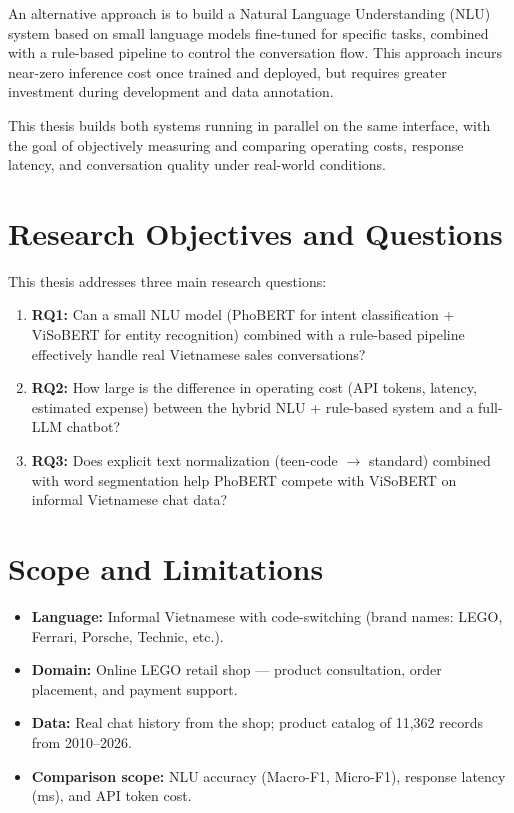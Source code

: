 \documentclass[12pt, a4paper]{report}
\begin{document}
An alternative approach is to build a Natural Language Understanding (NLU) system
based on small language models fine-tuned for specific tasks,
combined with a rule-based pipeline to control the conversation flow.
This approach incurs near-zero inference cost once trained and deployed,
but requires greater investment during development and data annotation.

This thesis builds both systems running in parallel on the same interface,
with the goal of objectively measuring and comparing operating costs,
response latency, and conversation quality under real-world conditions.

\section{Research Objectives and Questions}

This thesis addresses three main research questions:

\begin{enumerate}
  \item \textbf{RQ1:} Can a small NLU model (PhoBERT for intent classification +
        ViSoBERT for entity recognition) combined with a rule-based pipeline
        effectively handle real Vietnamese sales conversations?
  \item \textbf{RQ2:} How large is the difference in operating cost
        (API tokens, latency, estimated expense) between the hybrid NLU + rule-based
        system and a full-LLM chatbot?
  \item \textbf{RQ3:} Does explicit text normalization (teen-code $\rightarrow$ standard)
        combined with word segmentation help PhoBERT compete with ViSoBERT
        on informal Vietnamese chat data?
\end{enumerate}

\section{Scope and Limitations}

\begin{itemize}
  \item \textbf{Language:} Informal Vietnamese with code-switching
        (brand names: LEGO, Ferrari, Porsche, Technic, etc.).
  \item \textbf{Domain:} Online LEGO retail shop --- product consultation,
        order placement, and payment support.
  \item \textbf{Data:} Real chat history from the shop;
        product catalog of 11,362 records from 2010--2026.
  \item \textbf{Comparison scope:} NLU accuracy (Macro-F1, Micro-F1),
        response latency (ms), and API token cost.
\end{itemize}
\end{document}
